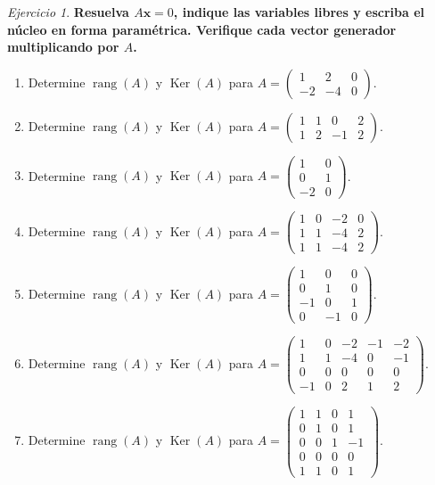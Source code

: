 \documentclass[12pt]{article}
\theoremstyle{remark}
\newtheorem{Ejer}[definicion]{Ejercicio}
\newcommand{\rang}{\operatorname{rang}}
\newcommand{\Ker}{\operatorname{Ker}}
\newcommand{\vect}[1]{\boldsymbol{#1}}
\begin{document}
\begin{Ejer}

\textbf{Resuelva $A\vect x=0$, indique las variables libres y escriba el núcleo en forma paramétrica. Verifique cada vector generador multiplicando por $A$.}
\begin{enumerate}[start=213]

\item Determine $\rang(A)$ y $\Ker(A)$ para $A=\begin{pmatrix}1&2&0\\-2&-4&0\end{pmatrix}$.

\item Determine $\rang(A)$ y $\Ker(A)$ para $A=\begin{pmatrix}1&1&0&2\\1&2&-1&2\end{pmatrix}$.

\item Determine $\rang(A)$ y $\Ker(A)$ para $A=\begin{pmatrix}1&0\\0&1\\-2&0\end{pmatrix}$.

\item Determine $\rang(A)$ y $\Ker(A)$ para $A=\begin{pmatrix}1&0&-2&0\\1&1&-4&2\\1&1&-4&2\end{pmatrix}$.

\item Determine $\rang(A)$ y $\Ker(A)$ para $A=\begin{pmatrix}1&0&0\\0&1&0\\-1&0&1\\0&-1&0\end{pmatrix}$.

\item Determine $\rang(A)$ y $\Ker(A)$ para $A=\begin{pmatrix}1&0&-2&-1&-2\\1&1&-4&0&-1\\0&0&0&0&0\\-1&0&2&1&2\end{pmatrix}$.

\item Determine $\rang(A)$ y $\Ker(A)$ para $A=\begin{pmatrix}1&1&0&1\\0&1&0&1\\0&0&1&-1\\0&0&0&0\\1&1&0&1\end{pmatrix}$.


\end{enumerate}
\end{Ejer}
\end{document}
